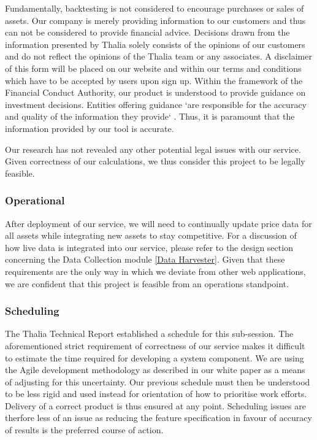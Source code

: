\documentclass[main.tex]{subfiles}
\begin{document}
Fundamentally, backtesting is not considered to encourage purchases or sales of assets. Our company is merely providing information to our customers and thus can not be considered to provide financial advice. Decisions drawn from the information presented by Thalia solely consists of the opinions of our customers and do not reflect the opinions of the Thalia team or any associates. A disclaimer of this form will be placed on our website and within our terms and conditions which have to be accepted by users upon sign up.
Within the framework of the Financial Conduct Authority, our product is understood to provide guidance on investment decisions. Entities offering guidance `are responsible for the accuracy and quality of the information they provide` \cite{fca_guidance_advice}. Thus, it is paramount that the information provided by our tool is accurate.

Our research has not revealed any other potential legal issues with our service. Given correctness of our calculations, we thus consider this project to be legally feasible.

\subsubsection{Operational}

After deployment of our service, we will need to continually update price data for all assets while integrating new assets to stay competitive. For a discussion of how live data is integrated into our service, please refer to the design section concerning the Data Collection module \ref{Data Harvester}. Given that these requirements are the only way in which we deviate from other web applications, we are confident that this project is feasible from an operations standpoint.

\subsubsection{Scheduling}

The Thalia Technical Report established a schedule for this sub-session. The aforementioned strict requirement of correctness of our service makes it difficult to estimate the time required for developing a system component. We are using the Agile development methodology as described in our white paper \cite{WP} as a means of adjusting for this uncertainty. Our previous schedule must then be understood to be less rigid and used instead for orientation of how to prioritise work efforts. Delivery of a correct product is thus ensured at any point. Scheduling issues are therfore less of an issue as reducing the feature specification in favour of accuracy of results is the preferred course of action.
\end{document}
